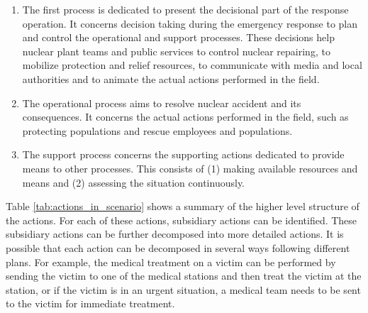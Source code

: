 \begin{enumerate}
	\item The first process is dedicated to present the decisional part of the response operation. It concerns decision taking during the emergency response to plan and control the operational and support processes. These decisions help nuclear plant teams and public services to control nuclear repairing, to mobilize protection and relief resources, to communicate with media and local authorities and to animate the actual actions performed in the field.
	\item The operational process aims to resolve nuclear accident and its consequences. It concerns the actual actions performed in the field, such as protecting populations and rescue employees and populations. 
	\item The support process concerns the supporting actions dedicated to provide means to other processes. This consists of (1) making available resources and means and (2) assessing the situation continuously.
\end{enumerate}

Table \ref{tab:actions_in_scenario} shows a summary of the higher level structure of the actions. For each of these actions, subsidiary actions can be identified. These subsidiary actions can be further decomposed into more detailed actions. It is possible that each action can be decomposed in several ways following different plans. For example, the medical treatment on a victim can be performed by sending the victim to one of the medical stations and then treat the victim at the station, or if the victim is in an urgent situation, a medical team needs to be sent to the victim for immediate treatment.

